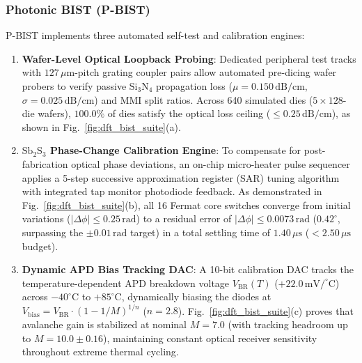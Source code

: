 \documentclass[journal]{IEEEtran}
\begin{document}
\subsubsection{Photonic BIST (P-BIST)}
P-BIST implements three automated self-test and calibration engines:
\begin{enumerate}
    \item \textbf{Wafer-Level Optical Loopback Probing}: Dedicated peripheral test tracks with $127\,\mu\mathrm{m}$-pitch grating coupler pairs allow automated pre-dicing wafer probers to verify passive $\mathrm{Si_3N_4}$ propagation loss ($\mu = 0.150\,\mathrm{dB/cm}$, $\sigma = 0.025\,\mathrm{dB/cm}$) and MMI split ratios. Across 640 simulated dies ($5\times 128$-die wafers), $100.0\%$ of dies satisfy the optical loss ceiling ($\le 0.25\,\mathrm{dB/cm}$), as shown in Fig.~\ref{fig:dft_bist_suite}(a).
    \item \textbf{$\mathrm{Sb_2S_3}$ Phase-Change Calibration Engine}: To compensate for post-fabrication optical phase deviations, an on-chip micro-heater pulse sequencer applies a 5-step successive approximation register (SAR) tuning algorithm with integrated tap monitor photodiode feedback. As demonstrated in Fig.~\ref{fig:dft_bist_suite}(b), all 16 Fermat core switches converge from initial variations ($|\Delta\phi| \le 0.25\,\mathrm{rad}$) to a residual error of $|\Delta\phi| \le 0.0073\,\mathrm{rad}$ ($0.42^\circ$, surpassing the $\pm 0.01\,\mathrm{rad}$ target) in a total settling time of $1.40\,\mu\mathrm{s}$ ($<2.50\,\mu\mathrm{s}$ budget).
    \item \textbf{Dynamic APD Bias Tracking DAC}: A 10-bit calibration DAC tracks the temperature-dependent APD breakdown voltage $V_{\mathrm{BR}}(T)$ ($+22.0\,\mathrm{mV/^\circ C}$) across $-40^\circ\mathrm{C}$ to $+85^\circ\mathrm{C}$, dynamically biasing the diodes at $V_{\mathrm{bias}} = V_{\mathrm{BR}} \cdot (1 - 1/M)^{1/n}$ ($n = 2.8$). Fig.~\ref{fig:dft_bist_suite}(c) proves that avalanche gain is stabilized at nominal $M = 7.0$ (with tracking headroom up to $M = 10.0 \pm 0.16$), maintaining constant optical receiver sensitivity throughout extreme thermal cycling.
\end{enumerate}
\end{document}
